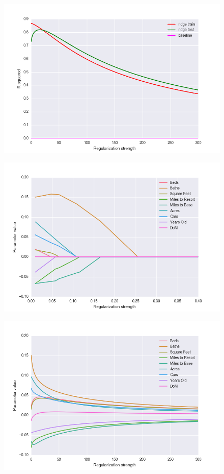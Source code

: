 \documentclass[a4paper, 12pt, oneside]{scrartcl}
\numberwithin{equation}{section}
\numberwithin{table}{section}
\numberwithin{figure}{section}
\begin{document}
\begin{figure}[H]
    \centering
    \includegraphics[width=\linewidth]{r2_ridge.png}
\end{figure}
\newpage
\begin{figure}
    \centering
    \includegraphics[width=\linewidth]{lasso__params.png}
\end{figure}

\begin{figure}
    \centering
    \includegraphics[width=\linewidth]{ridge__params.png}
\end{figure}
\end{document}
